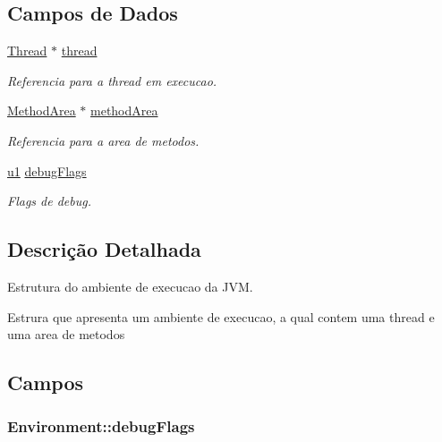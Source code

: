 \subsection*{Campos de Dados}
\begin{DoxyCompactItemize}
\item 
\hyperlink{struct_thread}{Thread} $\ast$ \hyperlink{struct_environment_a9521ae1091a45875768bdbbe0a339014}{thread}
\begin{DoxyCompactList}\small\item\em Referencia para a thread em execucao. \end{DoxyCompactList}\item 
\hyperlink{struct_method_area}{Method\+Area} $\ast$ \hyperlink{struct_environment_a1c73c41c6c38e7e67ea22f6d59044852}{method\+Area}
\begin{DoxyCompactList}\small\item\em Referencia para a area de metodos. \end{DoxyCompactList}\item 
\hyperlink{_e___j_v_m_8h_a216a9f8b04b4f0af84a4ca9d1d85a6ca}{u1} \hyperlink{struct_environment_a8c0e2258ed60e94b0c7a66eac8e27e64}{debug\+Flags}
\begin{DoxyCompactList}\small\item\em Flags de debug. \end{DoxyCompactList}\end{DoxyCompactItemize}


\subsection{Descrição Detalhada}
Estrutura do ambiente de execucao da J\+V\+M. 

Estrura que apresenta um ambiente de execucao, a qual contem uma thread e uma area de metodos 

\subsection{Campos}
\hypertarget{struct_environment_a8c0e2258ed60e94b0c7a66eac8e27e64}{}
\subsubsection[{debug\+Flags}]{ Environment\+::debug\+Flags}\label{struct_environment_a8c0e2258ed60e94b0c7a66eac8e27e64}


